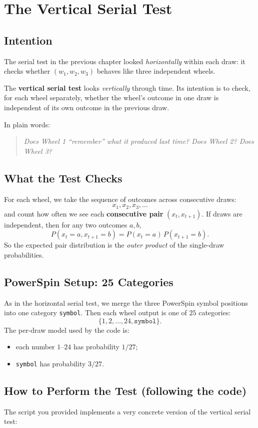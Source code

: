 \chapter{The Vertical Serial Test}

\section{Intention}
The serial test in the previous chapter looked \emph{horizontally} within each
draw: it checks whether \((w_1,w_2,w_3)\) behaves like three independent wheels.

The \textbf{vertical serial test} looks \emph{vertically} through time.  Its
intention is to check, for each wheel separately, whether the wheel's outcome
in one draw is independent of its own outcome in the previous draw.

In plain words:
\begin{quote}
  \emph{Does Wheel 1 ``remember'' what it produced last time?  Does Wheel 2?
  Does Wheel 3?}
\end{quote}

\section{What the Test Checks}
For each wheel, we take the sequence of outcomes across consecutive draws:
\[
  x_1, x_2, x_3, \dots
\]
and count how often we see each \textbf{consecutive pair}
\((x_t, x_{t+1})\).  If draws are independent, then for any two outcomes
\(a,b\),
\[
  P(x_{t}=a, x_{t+1}=b) = P(x_t=a)\,P(x_{t+1}=b).
\]
So the expected pair distribution is the \emph{outer product} of the single-draw
probabilities.

\section{PowerSpin Setup: 25 Categories}
As in the horizontal serial test, we merge the three PowerSpin symbol positions
into one category \texttt{symbol}.  Then each wheel output is one of \(25\)
categories:
\[
  \{1,2,\dots,24,\texttt{symbol}\}.
\]
The per-draw model used by the code is:
\begin{itemize}
  \item each number \(1\)--\(24\) has probability \(1/27\);
  \item \texttt{symbol} has probability \(3/27\).
\end{itemize}

\section{How to Perform the Test (following the code)}
The script you provided implements a very concrete version of the vertical
serial test:

